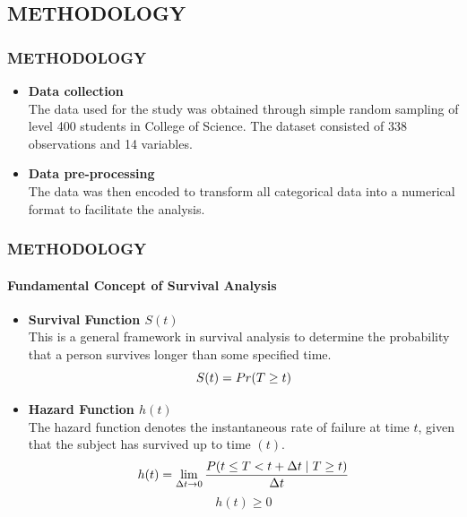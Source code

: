 \documentclass[12pt]{beamer}
\begin{document}
	
	\begin{frame}
 	\section{METHODOLOGY}

		\frametitle{METHODOLOGY}
		\begin{itemize}
			\item \textbf{Data collection}\\
The data used for the study was obtained through simple random sampling of level 400 students in College of Science. The dataset consisted of  338 observations and 14 variables. 
	
   		\vspace{0.3cm}

			\item \textbf{Data pre-processing}\\
The data was then encoded to transform all categorical data into a numerical format to facilitate the analysis.

   	\end{itemize}
    \end{frame}


\begin{frame}

		\frametitle{METHODOLOGY}
    \framesubtitle{Fundamental Concept of Survival Analysis}  
		\begin{itemize}
            \item  \textbf{Survival Function $S(t)$ }\\
This is a general framework in survival analysis to determine the probability that a person survives longer than some specified time.
\begin{equation}\scriptsize
    S(t) = Pr{(T \geq t)}
\end{equation}
    \item \textbf{Hazard Function $h(t)$}\\
   The hazard function denotes the instantaneous rate of failure at time $t$, given that the subject has survived up to time $(t)$. 
 \begin{equation} \scriptsize
h(t) = \lim_{\Delta t \to 0} \frac{P(t \le T < t + \Delta t \mid T \geq t)}{\Delta t}
\end{equation}
\scriptsize $$h\left(t\right)\geq0$$

   	\end{itemize}

    \end{frame}
 
\end{document}
